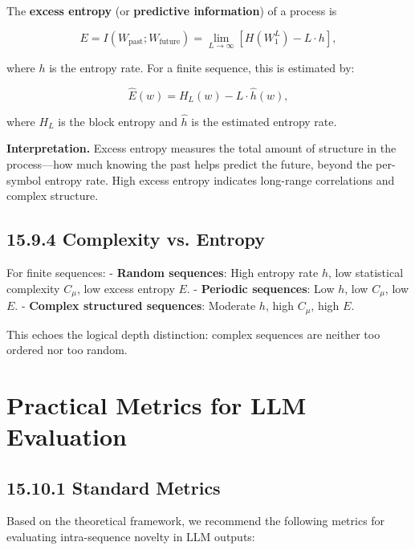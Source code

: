 \begin{definition}
The \textbf{excess entropy} (or \textbf{predictive information}) of a process is

\[E = I(W_{\text{past}}; W_{\text{future}}) = \lim_{L \to \infty} [H(W_1^L) - L \cdot h],\]

where $h$ is the entropy rate. For a finite sequence, this is estimated by:

\[\hat{E}(w) = H_L(w) - L \cdot \hat{h}(w),\]

where $H_L$ is the block entropy and $\hat{h}$ is the estimated entropy rate.

\textbf{Interpretation.} Excess entropy measures the total amount of structure in the process---how much knowing the past helps predict the future, beyond the per-symbol entropy rate. High excess entropy indicates long-range correlations and complex structure.
\end{definition}

\subsection{15.9.4 Complexity vs. Entropy}

\begin{proposition}
For finite sequences:
- \textbf{Random sequences}: High entropy rate $h$, low statistical complexity $C_\mu$, low excess entropy $E$.
- \textbf{Periodic sequences}: Low $h$, low $C_\mu$, low $E$.
- \textbf{Complex structured sequences}: Moderate $h$, high $C_\mu$, high $E$.

This echoes the logical depth distinction: complex sequences are neither too ordered nor too random.
\end{proposition}



\section{Practical Metrics for LLM Evaluation}

\subsection{15.10.1 Standard Metrics}

Based on the theoretical framework, we recommend the following metrics for evaluating intra-sequence novelty in LLM outputs:

